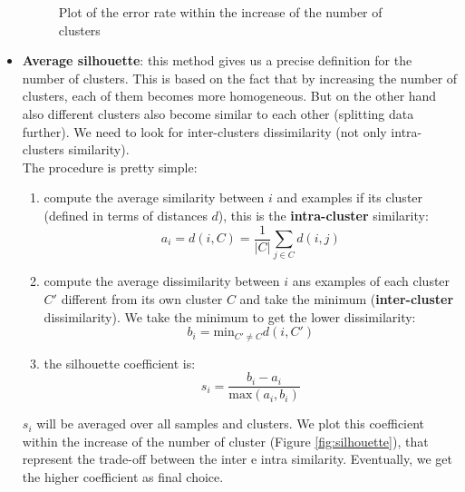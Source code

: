 \begin{itemize}
\begin{figure}
                    \caption{Plot of the error rate within the increase of the number of clusters}
                    \label{fig:elbow_method}
                \end{figure}
                \item \textbf{Average silhouette}: this method gives us a precise definition for the number of clusters. This is based on the fact that by increasing the number of clusters, each of them becomes more homogeneous. But on the other hand also different clusters also become similar to each other (splitting data further). We need to look for inter-clusters dissimilarity (not only intra-clusters similarity).\\
                The procedure is pretty simple:
                \begin{enumerate}
                    \item compute the average similarity between $i$ and examples if its cluster (defined in terms of distances $d$), this is the \textbf{intra-cluster} similarity: 
                    $$a_i = d(i, C) = \frac{1}{|C|} \sum_{j \in C} d(i, j)$$
                    \item compute the average dissimilarity between $i$ ans examples of each cluster $C'$ different from its own cluster $C$ and take the minimum (\textbf{inter-cluster} dissimilarity). We take the minimum to get the lower dissimilarity:
                    $$b_i = \text{min}_{C' \neq C} d(i, C')$$
                    \item the silhouette coefficient is:
                    $$s_i = \frac{b_i - a_i}{\text{max}(a_i, b_i)}$$
                \end{enumerate}
                $s_i$ will be averaged over all samples and clusters. We plot this coefficient within the increase of the number of cluster (Figure \ref{fig:silhouette}), that represent the trade-off between the inter e intra similarity. Eventually, we get the higher coefficient as final choice.
                \begin{figure}[ht]
                    \centering

\end{figure}
\end{itemize}
